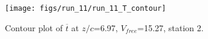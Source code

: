 \begin{figure}[H]
\centering
\texttt{[image: figs/run\_11/run\_11\_T\_contour]}
\caption{Contour plot of $\overline{t}$ at $z/c$=6.97, $V_{free}$=15.27, station 2.}
\label{fig:run_11_T_contour}
\end{figure}


